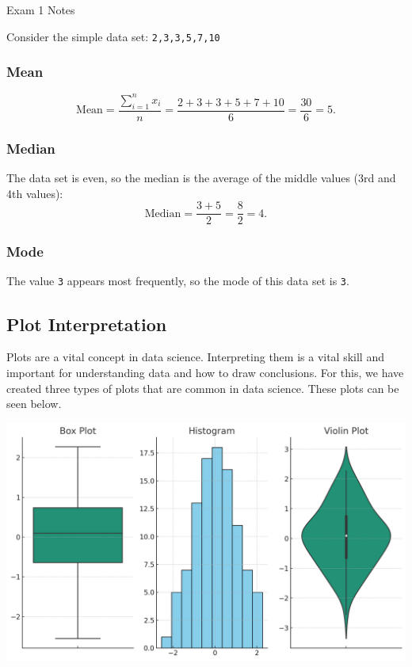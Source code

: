 \begin{examnotes}{Exam 1 Notes}
    \begin{highlight}
        Consider the simple data set: \texttt{2,3,3,5,7,10}
        \subsubsection*{Mean}
        \begin{equation*}
            \text{Mean} = \frac{\sum_{i = 1}^{n} x_{i}}{n} = \frac{2 + 3 + 3 + 5 + 7 + 10}{6} = \frac{30}{6} = 5.
        \end{equation*}
        \subsubsection*{Median}
        The data set is even, so the median is the average of the middle values (3rd and 4th values):
        \begin{equation*}
            \text{Median} = \frac{3 + 5}{2} = \frac{8}{2} = 4.
        \end{equation*}
        \subsubsection*{Mode}
        The value \texttt{3} appears most frequently, so the mode of this data set is \texttt{3}.
    \end{highlight}

    \subsection*{Plot Interpretation}

    Plots are a vital concept in data science. Interpreting them is a vital skill and important for understanding data and how to draw conclusions. For this, we have created three types of plots that
    are common in data science. These plots can be seen below.

    \begin{center}
        \includegraphics[scale=0.5]{Images/Plot Interpretation.png}
    \end{center}


\end{examnotes}
